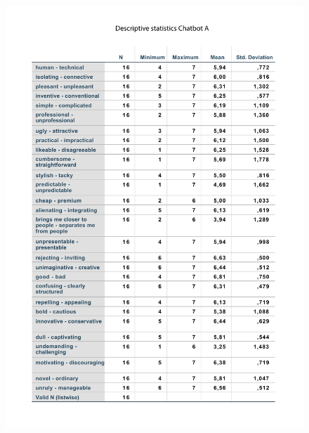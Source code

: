   \begin{figure}
        \centering
        \includegraphics[scale=0.7]{figures/DescriptiveChatbotA.pdf}
        \label{fig:deschatA}
    \end{figure}
    
